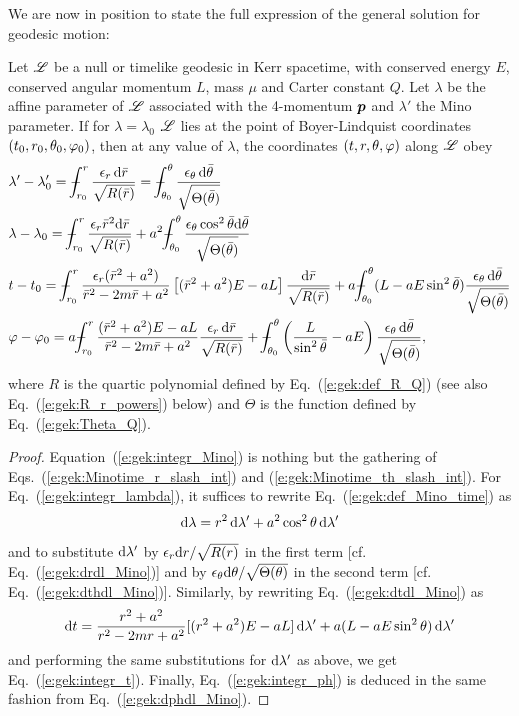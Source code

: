 We are now in position to state the full expression of the general
solution for geodesic motion:
\begin{greybox}
Let $\mathscr{L}$ be a null or timelike geodesic in Kerr spacetime,
with conserved energy $E$, conserved angular momentum $L$, mass $\mu$ and
Carter constant $Q$. Let $\lambda$ be the affine parameter of $\mathscr{L}$
associated with the 4-momentum $\bm{p}$ and $\lambda'$ the
Mino parameter. If for $\lambda=\lambda_0$
$\mathscr{L}$ lies at the point of Boyer-Lindquist coordinates $(t_0,r_0,\theta_0,\varphi_0)$,
then at any value of $\lambda$, the coordinates $(t,r,\theta,\varphi)$ along $\mathscr{L}$
obey
\begin{subequations}
\label{e:gek:integrated_eqs}
\begin{align}
 & \lambda' - \lambda'_0 = \dashint_{r_0}^r \frac{\eps_r \, \D \bar{r}}{\sqrt{R(\bar{r})}}
   = \dashint_{\th_0}^\th \frac{\eps_\th \, \D \bar{\th}}{\sqrt{\Theta(\bar{\th})}}
    \label{e:gek:integr_Mino}\\
 & \lambda - \lambda_0 = \dashint_{r_0}^r \frac{\eps_r \bar{r}^2 \D \bar{r}}{\sqrt{R(\bar{r})}}
    + a^2 \dashint_{\th_0}^\th \frac{\eps_\th \cos^2\bar{\th} \D \bar{\th}}{\sqrt{\Theta(\bar{\th})}}
    \label{e:gek:integr_lambda} \\
 & t - t_0 = \dashint_{r_0}^r  \frac{\eps_r (\bar{r}^2 + a^2)}{\bar{r}^2 - 2m \bar{r} + a^2}
 \left[ (\bar{r}^2 + a^2) E - a L \right] \frac{\D \bar{r}}{\sqrt{R(\bar{r})}}
 + a \dashint_{\th_0}^\th ( L - a E \sin^2\bar{\th} ) \frac{\eps_\th \, \D \bar{\th}}{\sqrt{\Theta(\bar{\th})}} \label{e:gek:integr_t} \\
 & \ph - \ph_0 = a \dashint_{r_0}^r  \frac{(\bar{r}^2 + a^2)E - a L}{\bar{r}^2 - 2m \bar{r} + a^2}
    \frac{\eps_r \, \D \bar{r}}{\sqrt{R(\bar{r})}}
    + \dashint_{\th_0}^\th \left( \frac{L}{\sin^2\bar{\th}} - a E  \right) \frac{\eps_\th \, \D \bar{\th}}{\sqrt{\Theta(\bar{\th})}} , \label{e:gek:integr_ph}
\end{align}
\end{subequations}
where $R$ is the quartic polynomial defined by Eq.~(\ref{e:gek:def_R_Q}) (see also Eq.~(\ref{e:gek:R_r_powers}) below) and $\Theta$ is the function defined by Eq.~(\ref{e:gek:Theta_Q}).
\end{greybox}
\begin{proof}
Equation~(\ref{e:gek:integr_Mino}) is nothing but the gathering of
Eqs.~(\ref{e:gek:Minotime_r_slash_int}) and (\ref{e:gek:Minotime_th_slash_int}).
For Eq.~(\ref{e:gek:integr_lambda}), it suffices to rewrite Eq.~(\ref{e:gek:def_Mino_time})
as
\[
    \mathrm{d}\lambda = r^2 \, \mathrm{d}\lambda' + a^2\cos^2\theta \, \mathrm{d}\lambda'
\]
and to substitute $\mathrm{d}\lambda'$ by $\epsilon_r \mathrm{d} r / \sqrt{R(r)}$
in the first term [cf. Eq.~(\ref{e:gek:drdl_Mino})] and by
$\epsilon_\theta \mathrm{d}\theta / \sqrt{\Theta(\theta)}$ in the second term [cf. Eq.~(\ref{e:gek:dthdl_Mino})].
Similarly, by rewriting Eq.~(\ref{e:gek:dtdl_Mino}) as
\[
    \mathrm{d} t = \frac{r^2 + a^2}{r^2 - 2mr + a^2} [(r^2 + a^2) E - a L] \, \mathrm{d}\lambda'
        + a ( L - a E \sin^2\theta ) \, \mathrm{d}\lambda'
\]
and performing the same substitutions for $\mathrm{d}\lambda'$ as above, we get
Eq.~(\ref{e:gek:integr_t}). Finally, Eq.~(\ref{e:gek:integr_ph}) is deduced
in the same fashion from Eq.~(\ref{e:gek:dphdl_Mino}).
\end{proof}

